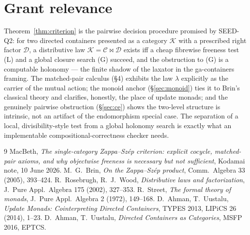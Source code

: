\documentclass[11pt]{article}
\theoremstyle{definition}
\newcommand{\C}{\mathcal{C}}
\newcommand{\D}{\mathcal{D}}
\newcommand{\K}{\mathcal{K}}
\begin{document}
\section{Grant relevance}

Theorem~\ref{thm:criterion} is the pairwise decision procedure promised by
SEED-Q2: for two directed containers presented as a category $\K$ with a
prescribed right factor $\D$, a distributive law $\K=\C\bowtie\D$ exists iff a
cheap fibrewise freeness test (L) and a global closure search (G) succeed, and the
obstruction to (G) is a computable holonomy --- the finite shadow of the laxator
in the ga-containers framing. The matched-pair calculus (\S4) exhibits the law
$\lambda$ explicitly as the carrier of the mutual action; the monoid anchor
(\S\ref{sec:monoid}) ties it to Brin's classical theory and clarifies, honestly,
the place of update monads; and the genuinely pairwise obstruction
(\S\ref{sec:ce}) shows the two-level structure is intrinsic, not an artifact of
the endomorphism special case. The separation of a local, divisibility-style
test from a global holonomy search is exactly what an implementable
compositional-correctness checker needs.

\begin{thebibliography}{9}
 MacBeth, \emph{The single-category Zappa--Sz\'ep criterion:
explicit cocycle, matched-pair axioms, and why objectwise freeness is necessary
but not sufficient}, Kodamai note, 10 June 2026.
 M.~G.~Brin, \emph{On the Zappa--Sz\'ep product}, Comm.\ Algebra
33 (2005), 393--424.
 R.~Rosebrugh, R.~J.~Wood, \emph{Distributive laws and factorization},
J.\ Pure Appl.\ Algebra 175 (2002), 327--353.
 R.~Street, \emph{The formal theory of monads}, J.\ Pure Appl.\
Algebra 2 (1972), 149--168.
 D.~Ahman, T.~Uustalu, \emph{Update Monads: Cointerpreting
Directed Containers}, TYPES 2013, LIPiCS 26 (2014), 1--23.
 D.~Ahman, T.~Uustalu, \emph{Directed Containers as Categories},
MSFP 2016, EPTCS.
\end{thebibliography}
\end{document}
